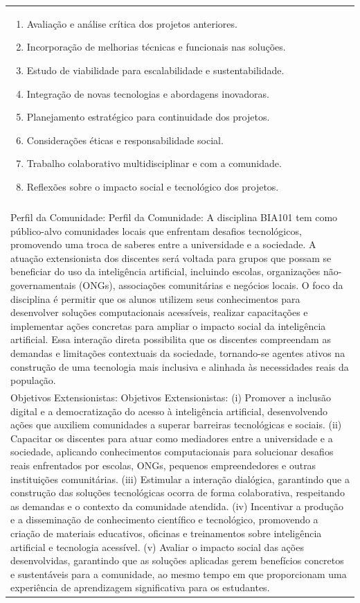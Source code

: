 \documentclass[11pt]{article}
\begin{document}
\begin{center}
\begin{longtable}{|p{4cm}|p{4cm}|p{4cm}|p{4cm}|}
{\begin{enumerate}
\item Avaliação e análise crítica dos projetos anteriores.
\item Incorporação de melhorias técnicas e funcionais nas soluções.
\item Estudo de viabilidade para escalabilidade e sustentabilidade.
\item Integração de novas tecnologias e abordagens inovadoras.
\item Planejamento estratégico para continuidade dos projetos.
\item Considerações éticas e responsabilidade social.
\item Trabalho colaborativo multidisciplinar e com a comunidade.
\item Reflexões sobre o impacto social e tecnológico dos projetos.\end{enumerate}}\\
\multicolumn{4}{|p{16cm}|}{}\\
\multicolumn{4}{|p{16cm}|}{Perfil da Comunidade: Perfil da Comunidade: A disciplina BIA101 tem como público-alvo comunidades locais que enfrentam desafios tecnológicos, promovendo uma troca de saberes entre a universidade e a sociedade. A atuação extensionista dos discentes será voltada para grupos que possam se beneficiar do uso da inteligência artificial, incluindo escolas, organizações não-governamentais (ONGs), associações comunitárias e negócios locais. O foco da disciplina é permitir que os alunos utilizem seus conhecimentos para desenvolver soluções computacionais acessíveis, realizar capacitações e implementar ações concretas para ampliar o impacto social da inteligência artificial. Essa interação direta possibilita que os discentes compreendam as demandas e limitações contextuais da sociedade, tornando-se agentes ativos na construção de uma tecnologia mais inclusiva e alinhada às necessidades reais da população.}\\
\multicolumn{4}{|p{16cm}|}{Objetivos Extensionistas: Objetivos Extensionistas: (i) Promover a inclusão digital e a democratização do acesso à inteligência artificial, desenvolvendo ações que auxiliem comunidades a superar barreiras tecnológicas e sociais. (ii) Capacitar os discentes para atuar como mediadores entre a universidade e a sociedade, aplicando conhecimentos computacionais para solucionar desafios reais enfrentados por escolas, ONGs, pequenos empreendedores e outras instituições comunitárias. (iii) Estimular a interação dialógica, garantindo que a construção das soluções tecnológicas ocorra de forma colaborativa, respeitando as demandas e o contexto da comunidade atendida. (iv) Incentivar a produção e a disseminação de conhecimento científico e tecnológico, promovendo a criação de materiais educativos, oficinas e treinamentos sobre inteligência artificial e tecnologia acessível. (v) Avaliar o impacto social das ações desenvolvidas, garantindo que as soluções aplicadas gerem benefícios concretos e sustentáveis para a comunidade, ao mesmo tempo em que proporcionam uma experiência de aprendizagem significativa para os estudantes.}\\

\end{longtable}
\end{center}
\end{document}

